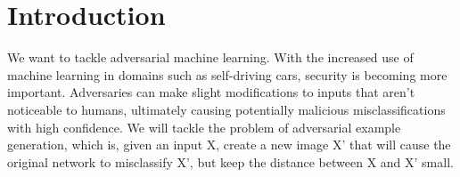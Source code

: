 \section{Introduction}
We want to tackle adversarial machine learning. With the increased use of machine learning in domains such as self-driving cars, security is becoming more important. Adversaries can make slight modifications to inputs that aren’t noticeable to humans, ultimately causing potentially malicious misclassifications with high confidence. We will tackle the problem of adversarial example generation, which is, given an input X, create a new image X' that will cause the original network to misclassify X', but keep the distance between X and X' small. 
